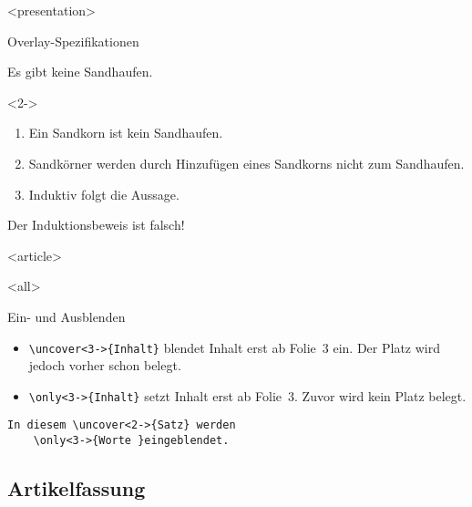 \mode
<presentation>

\begin{Frame}{Overlay-Spezifikationen}
  \begin{Satz}[Sandhaufensatz]
    Es gibt keine Sandhaufen.
  \end{Satz}

  \begin{Beweis}<2->
    \begin{enumerate}
      \item<3-> Ein Sandkorn ist kein Sandhaufen.
      \item<4-> Sandkörner werden durch Hinzufügen
        eines Sandkorns nicht zum Sandhaufen.
      \item Induktiv folgt die Aussage. \qedhere
    \end{enumerate}
  \end{Beweis}


  Der \alert<6>{Induktionsbeweis} ist
  \alert<7>{falsch}!
\end{Frame}

\mode
<article>

\frame{}

\mode
<all>

\begin{Frame}[fragile]{Ein- und Ausblenden}
  \begin{itemize}
    \item \lstinline|\uncover<3->{Inhalt}| blendet Inhalt erst ab
      Folie~3 ein. Der Platz wird jedoch vorher schon belegt.
    \item \lstinline|\only<3->{Inhalt}| setzt Inhalt erst ab Folie~3.
      Zuvor wird kein Platz belegt.
  \end{itemize}

  \xxx
  \pause

  \begin{lstlisting}[gobble=4]
    In diesem \uncover<2->{Satz} werden
    \only<3->{Worte }eingeblendet.
  \end{lstlisting}
\end{Frame}

\subsection{Artikelfassung}

